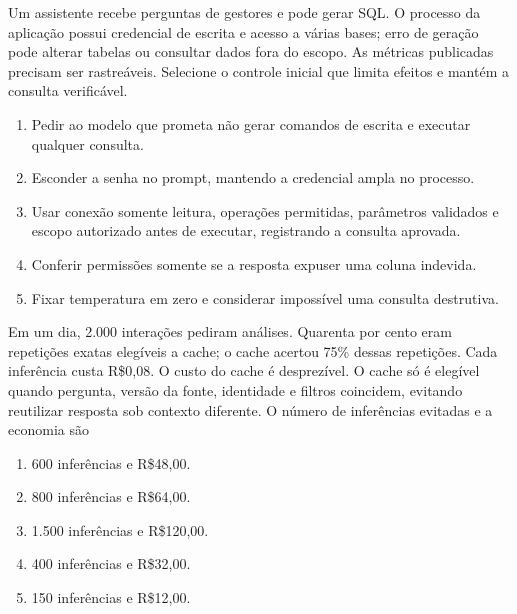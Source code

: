 \TextoBase
Um assistente recebe perguntas de gestores e pode gerar SQL. O processo da aplicação possui credencial de escrita e acesso a várias bases; erro de geração pode alterar tabelas ou consultar dados fora do escopo. As métricas publicadas precisam ser rastreáveis.
\FonteDidatica
\Comando Selecione o controle inicial que limita efeitos e mantém a consulta verificável.
\begin{enumerate}[label=\Alph*)]
\item Pedir ao modelo que prometa não gerar comandos de escrita e executar qualquer consulta.
\item Esconder a senha no prompt, mantendo a credencial ampla no processo.
\item Usar conexão somente leitura, operações permitidas, parâmetros validados e escopo autorizado antes de executar, registrando a consulta aprovada.
\item Conferir permissões somente se a resposta expuser uma coluna indevida.
\item Fixar temperatura em zero e considerar impossível uma consulta destrutiva.
\end{enumerate}

\TextoBase
Em um dia, 2.000 interações pediram análises. Quarenta por cento eram repetições exatas elegíveis a cache; o cache acertou 75\% dessas repetições. Cada inferência custa R\$0,08. O custo do cache é desprezível.
O cache só é elegível quando pergunta, versão da fonte, identidade e filtros coincidem, evitando reutilizar resposta sob contexto diferente.
\FonteDidatica
\Comando O número de inferências evitadas e a economia são
\begin{enumerate}[label=\Alph*)]
\item 600 inferências e R\$48,00.
\item 800 inferências e R\$64,00.
\item 1.500 inferências e R\$120,00.
\item 400 inferências e R\$32,00.
\item 150 inferências e R\$12,00.
\end{enumerate}

